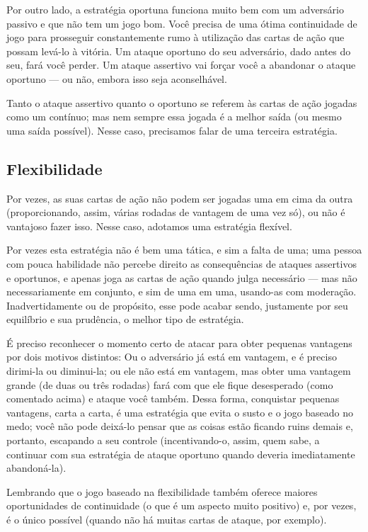 Por outro lado, a estratégia oportuna funciona muito bem com um adversário passivo e que não tem um jogo bom. Você precisa de uma ótima continuidade de jogo para prosseguir constantemente rumo à utilização das cartas de ação que possam levá-lo à vitória. Um ataque oportuno do seu adversário, dado antes do seu, fará você perder. Um ataque assertivo vai forçar você a abandonar o ataque oportuno --- ou não, embora isso seja aconselhável.

Tanto o ataque assertivo quanto o oportuno se referem às cartas de ação jogadas como um contínuo; mas nem sempre essa jogada é a melhor saída (ou mesmo uma saída possível). Nesse caso, precisamos falar de uma terceira estratégia.

\subsection{Flexibilidade}

Por vezes, as suas cartas de ação não podem ser jogadas uma em cima da outra (proporcionando, assim, várias rodadas de vantagem de uma vez só), ou não é vantajoso fazer isso. Nesse caso, adotamos uma estratégia flexível.

Por vezes esta estratégia não é bem uma tática, e sim a falta de uma; uma pessoa com pouca habilidade não percebe direito as consequências de ataques assertivos e oportunos, e apenas joga as cartas de ação quando julga necessário --- mas não necessariamente em conjunto, e sim de uma em uma, usando-as com moderação. Inadvertidamente ou de propósito, esse pode acabar sendo, justamente por seu equilíbrio e sua prudência, o melhor tipo de estratégia.

É preciso reconhecer o momento certo de atacar para obter pequenas vantagens por dois motivos distintos: Ou o adversário já está em vantagem, e é preciso dirimi-la ou diminui-la; ou ele não está em vantagem, mas obter uma vantagem grande (de duas ou três rodadas) fará com que ele fique desesperado (como comentado acima) e ataque você também. Dessa forma, conquistar pequenas vantagens, carta a carta, é uma estratégia que evita o susto e o jogo baseado no medo; você não pode deixá-lo pensar que as coisas estão ficando ruins demais e, portanto, escapando a seu controle (incentivando-o, assim, quem sabe, a continuar com sua estratégia de ataque oportuno quando deveria imediatamente abandoná-la).

Lembrando que o jogo baseado na flexibilidade também oferece maiores oportunidades de continuidade (o que é um aspecto muito positivo) e, por vezes, é o único possível (quando não há muitas cartas de ataque, por exemplo).

